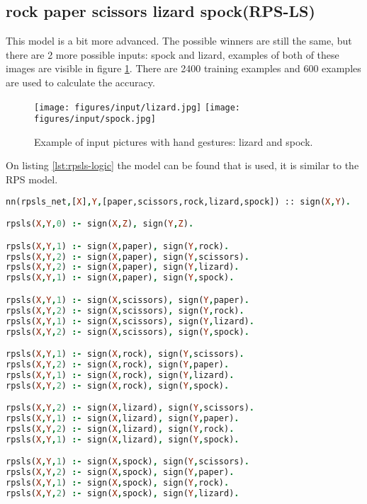 \subsection{rock paper scissors lizard spock(RPS-LS)}

This model is a bit more advanced. The possible winners are still the same, but there are 2 more possible inputs: spock and lizard, examples of both of these images are visible in figure \ref{fig:rpsls_input}. There are 2400 training examples and 600 examples are used to calculate the accuracy. 

\begin{figure}[htp]
    \centering
    \texttt{[image: figures/input/lizard.jpg]}
    \texttt{[image: figures/input/spock.jpg]}
    \caption{Example of input pictures with hand gestures: lizard and spock\cite{RPSLS-database}.} %
    \label{fig:rpsls_input}
\end{figure}

On listing \ref{lst:rpsls-logic} the model can be found that is used, it is similar to the RPS model.

\begin{lstlisting}[label={lst:rpsls-logic},language=Prolog,frame=single,caption={Rock paper scissors lizard spock DeepProbLog model},captionpos=b]
nn(rpsls_net,[X],Y,[paper,scissors,rock,lizard,spock]) :: sign(X,Y).

rpsls(X,Y,0) :- sign(X,Z), sign(Y,Z).

rpsls(X,Y,1) :- sign(X,paper), sign(Y,rock).
rpsls(X,Y,2) :- sign(X,paper), sign(Y,scissors).
rpsls(X,Y,2) :- sign(X,paper), sign(Y,lizard).
rpsls(X,Y,1) :- sign(X,paper), sign(Y,spock).

rpsls(X,Y,1) :- sign(X,scissors), sign(Y,paper).
rpsls(X,Y,2) :- sign(X,scissors), sign(Y,rock).
rpsls(X,Y,1) :- sign(X,scissors), sign(Y,lizard).
rpsls(X,Y,2) :- sign(X,scissors), sign(Y,spock).

rpsls(X,Y,1) :- sign(X,rock), sign(Y,scissors).
rpsls(X,Y,2) :- sign(X,rock), sign(Y,paper).
rpsls(X,Y,1) :- sign(X,rock), sign(Y,lizard).
rpsls(X,Y,2) :- sign(X,rock), sign(Y,spock).

rpsls(X,Y,2) :- sign(X,lizard), sign(Y,scissors).
rpsls(X,Y,1) :- sign(X,lizard), sign(Y,paper).
rpsls(X,Y,2) :- sign(X,lizard), sign(Y,rock).
rpsls(X,Y,1) :- sign(X,lizard), sign(Y,spock).

rpsls(X,Y,1) :- sign(X,spock), sign(Y,scissors).
rpsls(X,Y,2) :- sign(X,spock), sign(Y,paper).
rpsls(X,Y,1) :- sign(X,spock), sign(Y,rock).
rpsls(X,Y,2) :- sign(X,spock), sign(Y,lizard).
    \end{lstlisting}


